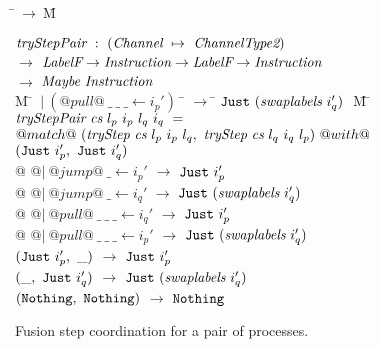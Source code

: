 
\begin{figure}
\begin{tabbing}
\=$~\to~$\=M\kill

$\textit{tryStepPair} ~:~ (\textit{Channel} ~\mapsto~ \textit{ChannelType2})$ \\
\> $\to$ \> $\textit{LabelF} \to \textit{Instruction} \to \textit{LabelF} \to \textit{Instruction}$ \\
\> $\to$ \> $\textit{Maybe}~\textit{Instruction}$ \\

M \= $~|~(@pull@~\_~\_~\_ \gets i_p')~$ \= $\to$ \= $\texttt{Just}~ (\textit{swaplabels}~i_q')~$ \= M \=\kill
$\textit{tryStepPair} ~\textit{cs}~l_p~i_p~l_q~i_q~=$ \\
\> $@match@~ (\textit{tryStep}~\textit{cs}~l_p~i_p~l_q,~\textit{tryStep}~\textit{cs}~l_q~i_q~l_p) ~@with@$ \\
\> $(\texttt{Just}~ i_p',~\texttt{Just}~ i_q')$ \\

\> @ @$|~@jump@~\_ \gets i_p'$ \> $\to$ \> $\texttt{Just}~ i_p'$
\>  \\[0.5ex]

\> @ @$|~@jump@~\_ \gets i_q'$ \> $\to$ \> $\texttt{Just}~ (\textit{swaplabels}~i_q')$
\>  \\[0.5ex]

\> @ @$|~@pull@~\_~\_~\_ \gets i_q'$ \> $\to$ \> $\texttt{Just}~ i_p'$
\>  \\[0.5ex]

\> @ @$|~@pull@~\_~\_~\_ \gets i_p'$ \> $\to$ \> $\texttt{Just}~ (\textit{swaplabels}~i_q')$
\>  \\[0.5ex]

\> $(\texttt{Just}~ i_p',~\_)$ \> $\to$ \> $\texttt{Just}~ i_p'$
\>  \\[0.5ex]

\> $(\_, ~\texttt{Just}~ i_q')$ \> $\to$ \> $\texttt{Just}~ (\textit{swaplabels}~i_q')$
\>  \\[0.5ex]

\> $(\texttt{Nothing}, ~\texttt{Nothing})$ \> $\to$ \> $\texttt{Nothing}$
\> 
\end{tabbing}
\caption{Fusion step coordination for a pair of processes.}
\label{fig:Fusion:Def:StepPair}
\end{figure}

